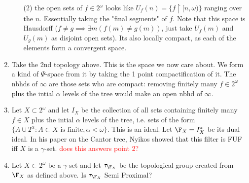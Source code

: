 \documentclass{article}
\begin{document}
\begin{enumerate}
\begin{itemize}
        \item[(2)] the open sets of \(f \in 2^{\omega}\) looks like \(U_f(n) = \{f\upharpoonright [n, \omega)\}\) ranging over the \(n\). Essentially taking the "final segments" of \(f\). Note that this space is Hausdorff (\(f\neq g \implies \exists m (f(m) \neq g(m))\), just take \(U_f(m)\) and \(U_g(m)\) as disjoint open sets). Its also locally compact, as each of the elements form a convergent space. 
    \end{itemize}
    \item Take the 2nd topology above. This is the space we now care about. We form a kind of \(\Psi\)-space from it by taking the 1 point compactification of it. The nbhds of \(\infty\) are those sets who are compact: removing finitely many \(f \in 2^{\omega}\) plus the intial \(\alpha\) levels of the tree would make an open nbhd of \(\infty\). 
    \item Let \(X \subset 2^{\omega}\) and let \(I_X\) be the collection of all sets containing finitely many \(f \in X\) plus the intial \(\alpha\) levels of the tree, i.e. sets of the form \(\{A\cup 2^{\alpha}: A \subset X \text{ is finite}, \alpha < \omega\}\). This is an ideal. Let \(\F_X = I_X^{\ast}\) be its dual ideal. In his paper on the Cantor tree, Nyikos showed that this filter is FUF iff \(X\) is a \(\gamma\)-set. \textcolor{red}{does this answers point 2?}
    \item Let \(X \subset 2^{\omega}\) be a \(\gamma\)-set and let \(\tau_{\F_X}\) be the topological group created from \(\F_X\) as defined above. Is \(\tau_{\F_X}\) Semi Proximal?
\end{enumerate}
\end{document}

